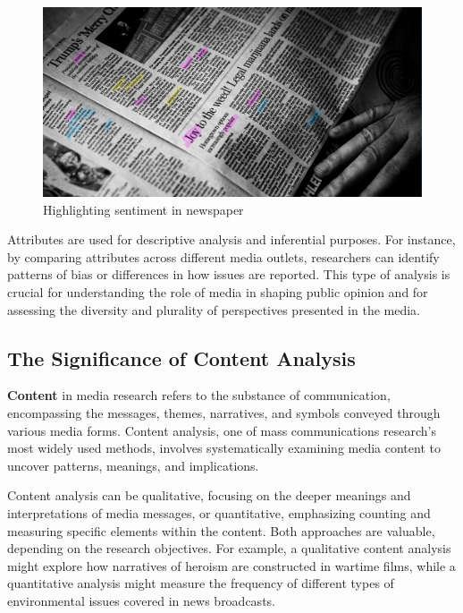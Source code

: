 \documentclass[
]{book}
\begin{document}
\begin{figure}
\centering
\includegraphics[width=1\linewidth,height=\textheight,keepaspectratio]{images/fig01a.jpg}
\caption{Highlighting sentiment in newspaper}
\end{figure}

Attributes are used for descriptive analysis and inferential purposes. For instance, by comparing attributes across different media outlets, researchers can identify patterns of bias or differences in how issues are reported. This type of analysis is crucial for understanding the role of media in shaping public opinion and for assessing the diversity and plurality of perspectives presented in the media.

\subsection*{The Significance of Content Analysis}\label{the-significance-of-content-analysis}

\textbf{Content} in media research refers to the substance of communication, encompassing the messages, themes, narratives, and symbols conveyed through various media forms. Content analysis, one of mass communications research's most widely used methods, involves systematically examining media content to uncover patterns, meanings, and implications.

Content analysis can be qualitative, focusing on the deeper meanings and interpretations of media messages, or quantitative, emphasizing counting and measuring specific elements within the content. Both approaches are valuable, depending on the research objectives. For example, a qualitative content analysis might explore how narratives of heroism are constructed in wartime films, while a quantitative analysis might measure the frequency of different types of environmental issues covered in news broadcasts.
\end{document}
